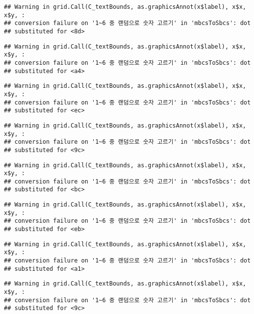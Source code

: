\documentclass[]{book}
\begin{document}
\begin{verbatim}
## Warning in grid.Call(C_textBounds, as.graphicsAnnot(x$label), x$x, x$y, :
## conversion failure on '1~6 중 랜덤으로 숫자 고르기' in 'mbcsToSbcs': dot
## substituted for <8d>
\end{verbatim}

\begin{verbatim}
## Warning in grid.Call(C_textBounds, as.graphicsAnnot(x$label), x$x, x$y, :
## conversion failure on '1~6 중 랜덤으로 숫자 고르기' in 'mbcsToSbcs': dot
## substituted for <a4>
\end{verbatim}

\begin{verbatim}
## Warning in grid.Call(C_textBounds, as.graphicsAnnot(x$label), x$x, x$y, :
## conversion failure on '1~6 중 랜덤으로 숫자 고르기' in 'mbcsToSbcs': dot
## substituted for <ec>
\end{verbatim}

\begin{verbatim}
## Warning in grid.Call(C_textBounds, as.graphicsAnnot(x$label), x$x, x$y, :
## conversion failure on '1~6 중 랜덤으로 숫자 고르기' in 'mbcsToSbcs': dot
## substituted for <9c>
\end{verbatim}

\begin{verbatim}
## Warning in grid.Call(C_textBounds, as.graphicsAnnot(x$label), x$x, x$y, :
## conversion failure on '1~6 중 랜덤으로 숫자 고르기' in 'mbcsToSbcs': dot
## substituted for <bc>
\end{verbatim}

\begin{verbatim}
## Warning in grid.Call(C_textBounds, as.graphicsAnnot(x$label), x$x, x$y, :
## conversion failure on '1~6 중 랜덤으로 숫자 고르기' in 'mbcsToSbcs': dot
## substituted for <eb>
\end{verbatim}

\begin{verbatim}
## Warning in grid.Call(C_textBounds, as.graphicsAnnot(x$label), x$x, x$y, :
## conversion failure on '1~6 중 랜덤으로 숫자 고르기' in 'mbcsToSbcs': dot
## substituted for <a1>
\end{verbatim}

\begin{verbatim}
## Warning in grid.Call(C_textBounds, as.graphicsAnnot(x$label), x$x, x$y, :
## conversion failure on '1~6 중 랜덤으로 숫자 고르기' in 'mbcsToSbcs': dot
## substituted for <9c>
\end{verbatim}
\end{document}
